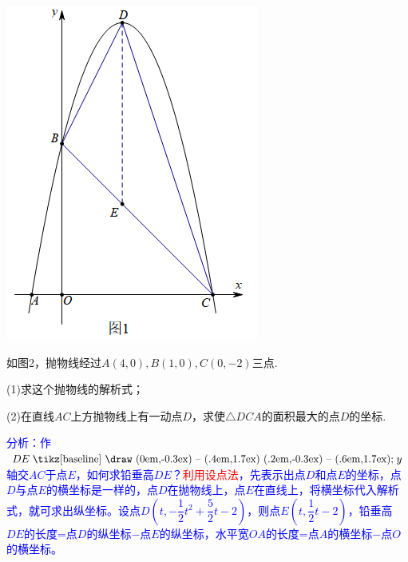 \documentclass[10pt]{ctexart}
\newcommand\pxx{%
		\mathrel{\text{\tikz[baseline] \draw (0em,-0.3ex) -- (.4em,1.7ex) (.2em,-0.3ex) -- (.6em,1.7ex);}%
	}}
\begin{document}
\begin{minipage}[c]{0.4\textwidth}
  \includegraphics[scale=0.8]{figure/mj-16.png}
\end{minipage}

\begin{shaded}
\begin{example}
如图2，抛物线经过$A(4,0),B(1,0),C(0,-2)$三点.

(1)求这个抛物线的解析式；

(2)在直线$AC$上方抛物线上有一动点$D$，求使$\triangle DCA$的面积最大的点$D$的坐标.
\end{example}
\end{shaded}
{\kaishu \textcolor{blue} {分析：作$DE \pxx y$轴交$AC$于点$E$，如何求铅垂高$DE$？\textcolor{red}{利用设点法}，先表示出点$D$和点$E$的坐标，点$D$与点$E$的横坐标是一样的，点$D$在抛物线上，点$E$在直线上，将横坐标代入解析式，就可求出纵坐标。设点$D(t,-\dfrac{1}{2}t^2+\dfrac{5}{2}t-2)$，则点$E(t,\dfrac{1}{2}t-2)$，铅垂高$DE$的长度=点$D$的纵坐标$-$点$E$的纵坐标，水平宽$OA$的长度=点$A$的横坐标$-$点$O$的横坐标。}}
\end{document}
